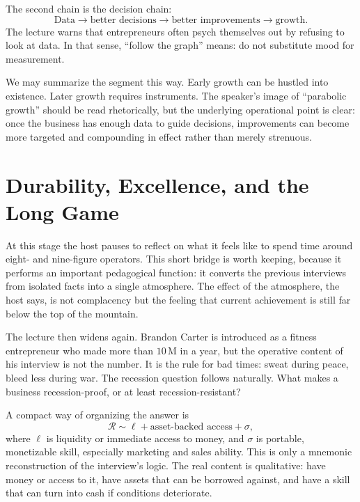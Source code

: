 The second chain is the decision chain:
\begin{equation}
\text{Data} \rightarrow \text{better decisions} \rightarrow \text{better improvements} \rightarrow \text{growth}.
\end{equation}
The lecture warns that entrepreneurs often psych themselves out by refusing to look at data. In that sense, ``follow the graph'' means: do not substitute mood for measurement.

We may summarize the segment this way. Early growth can be hustled into existence. Later growth requires instruments. The speaker's image of ``parabolic growth'' should be read rhetorically, but the underlying operational point is clear: once the business has enough data to guide decisions, improvements can become more targeted and compounding in effect rather than merely strenuous.

\section{Durability, Excellence, and the Long Game}

At this stage the host pauses to reflect on what it feels like to spend time around eight- and nine-figure operators. This short bridge is worth keeping, because it performs an important pedagogical function: it converts the previous interviews from isolated facts into a single atmosphere. The effect of the atmosphere, the host says, is not complacency but the feeling that current achievement is still far below the top of the mountain.

The lecture then widens again. Brandon Carter is introduced as a fitness entrepreneur who made more than \(10\,\mathrm{M}\) in a year, but the operative content of his interview is not the number. It is the rule for bad times: sweat during peace, bleed less during war. The recession question follows naturally. What makes a business recession-proof, or at least recession-resistant?

A compact way of organizing the answer is
\begin{equation}
\mathcal{R}\sim \ell+\text{asset-backed access}+\sigma,
\end{equation}
where \(\ell\) is liquidity or immediate access to money, and \(\sigma\) is portable, monetizable skill, especially marketing and sales ability. This is only a mnemonic reconstruction of the interview's logic. The real content is qualitative: have money or access to it, have assets that can be borrowed against, and have a skill that can turn into cash if conditions deteriorate.

